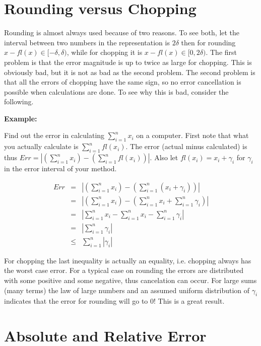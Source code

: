 \section{Rounding versus Chopping}

Rounding is almost always used because of two reasons.  To see both, let the interval between two numbers in the representation is $2\delta$ then for rounding $x-fl(x)\in [-\delta,\delta)$, while for chopping it is $x-fl(x)\in [0,2\delta)$.  The first problem is that the error magnitude is up to twice as large for chopping.  This is obviously bad, but it is not as bad as the second problem.  The second problem is that all the errors of chopping have the same sign, so no error cancellation is possible when calculations are done.  To see why this is bad, consider the following.

\vspace{.1in}\noindent
\textbf{Example:}

Find out the error in calculating $\sum_{i=1}^{n}x_i$ on a computer.  First note that what you actually calculate is $\sum_{i=1}^{n}fl(x_i)$.  The error (actual minus calculated) is thus $Err=\left|(\sum_{i=1}^{n}x_i)-(\sum_{i=1}^{n}fl(x_i))\right|$.  Also let $fl(x_i)=x_i+\gamma_i$ for $\gamma_i$ in the error interval of your method.

\begin{eqnarray*}
  Err &=& \left|(\sum_{i=1}^{n}x_i)-(\sum_{i=1}^{n}(x_i+\gamma_i))\right| \\
    &=& \left|(\sum_{i=1}^{n}x_i)-(\sum_{i=1}^{n}x_i+\sum_{i=1}^{n}\gamma_i)\right| \\
    &=& \left|\sum_{i=1}^{n}x_i-\sum_{i=1}^{n}x_i-\sum_{i=1}^{n}\gamma_i\right| \\
    &=& \left|\sum_{i=1}^{n}\gamma_i\right| \\
    &\leq & \sum_{i=1}^{n}\left|\gamma_i\right|
\end{eqnarray*}

For chopping the last inequality is actually an equality, i.e. chopping always has the worst case error.  For a typical case on rounding the errors are distributed with some positive and some negative, thus cancelation can occur.  For large sums (many terms) the law of large numbers and an assumed uniform distribution of $\gamma_i$ indicates that the error for rounding will go to $0$!  This is a great result.

\section{Absolute and Relative Error}

